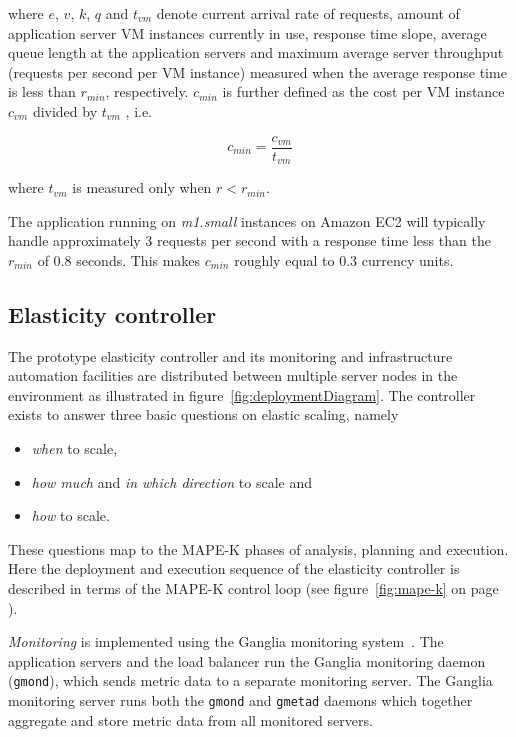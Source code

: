 \documentclass[english]{tktltiki2}
\theoremstyle{definition}
\theoremstyle{remark}
\begin{document}
where $e$, $v$, $k$, $q$ and $t_{vm}$ denote current arrival rate of requests,
amount of application server VM instances currently in use, response time slope,
average queue length at the application servers and maximum average
server throughput (requests per second per VM instance) measured when the average
response time is less than $r_{min}$, respectively. $c_{min}$ is further defined
as the cost per VM instance $c_{vm}$ divided by $t_{vm}$ , i.e.

\begin{equation}
	c_{min} = 
	\frac{c_{vm}}{t_{vm}} 
	\label{eq:costMin}
\end{equation}

where $t_{vm}$ is measured only when $r < r_{min}$. 

The application running on \textit{m1.small} instances on Amazon EC2 will
typically handle approximately 3 requests per second with a response time less
than the $r_{min}$ of 0.8 seconds. This makes $c_{min}$
roughly equal to 0.3 currency units.

\subsection{Elasticity controller}

The prototype elasticity controller and its monitoring and infrastructure automation facilities are distributed between multiple server nodes
in the environment as illustrated in figure~\ref{fig:deploymentDiagram}. The controller exists to answer three basic questions on
elastic scaling, namely 
\begin{itemize}
	\item{\textit{when} to scale,}
	\item{\textit{how much} and \textit{in which direction} to scale and}
  	\item{\textit{how} to scale}.
\end{itemize}

These questions map to the MAPE-K phases of analysis, planning and execution.
Here the deployment and execution sequence of the elasticity controller is
described in terms of the MAPE-K control loop (see
figure~\ref{fig:mape-k} on page \pageref{fig:mape-k}).

\textit{Monitoring} is implemented using the Ganglia monitoring
system~\cite{gangliapaper}. The application servers and the load balancer run the
Ganglia monitoring daemon (\texttt{gmond}), which sends metric data to a
separate monitoring server. The Ganglia monitoring server runs both the
\texttt{gmond} and \texttt{gmetad} daemons which together aggregate and store metric
data from all monitored servers. 
\end{document}
